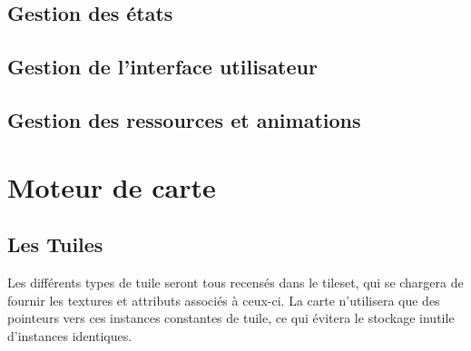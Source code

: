 \documentclass[a4paper]{article}
\newcommand{\alinea}{\hspace*{0.5cm}}
\begin{document}
      \subsection{Gestion des états}
      
      \subsection{Gestion de l'interface utilisateur}
      
      \subsection{Gestion des ressources et animations}
      
	\section{Moteur de carte}
      \subsection{Les Tuiles}
        \alinea Les différents types de tuile seront tous recensés dans le tileset, qui se chargera de fournir les textures et attributs associés à ceux-ci. La carte n'utilisera que des pointeurs vers ces instances constantes de tuile, ce  qui évitera le stockage inutile d'instances identiques.
        
\end{document}
